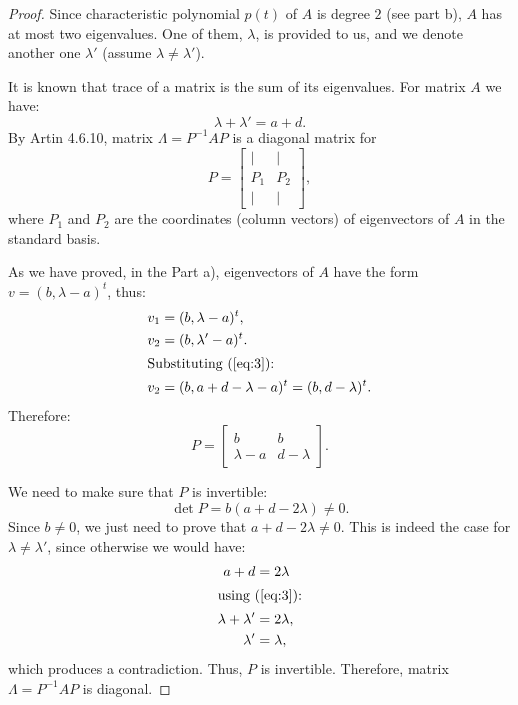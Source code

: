 \documentclass{article}
\theoremstyle{definition}
\begin{document}
\begin{proof}

Since characteristic polynomial $p(t)$ of $A$ is degree $2$ (see part b), $A$ has at most two eigenvalues. One of them, $\lambda$, is provided to us, and we denote another one $\lambda'$ (assume $\lambda \neq \lambda'$).

It is known that trace of a matrix is the sum of its eigenvalues. For matrix $A$ we have:
\begin{equation} \label{eq:3}
    \lambda + \lambda' = a+d.
\end{equation}
By Artin 4.6.10, matrix $\Lambda = P^{-1} A P$ is a diagonal matrix for
\[
    P = 
    \begin{bmatrix}
        | & | \\
        P_1 & P_2 \\
        | & |
    \end{bmatrix},
\]
where $P_1$ and $P_2$ are the coordinates (column vectors) of eigenvectors of $A$ in the standard basis.

As we have proved, in the Part a), eigenvectors of $A$ have the form $v = (b, \lambda - a)^t$, thus:
\begin{align*}
    v_1
    & = (b, \lambda - a)^t, \\
    v_2 
    & = (b, \lambda' - a)^t. \\
    \intertext{Substituting (\ref{eq:3}):}
    v_2
    & = (b, a+d-\lambda - a)^t = (b, d - \lambda)^t.
\end{align*}
Therefore:
\[
    P = 
    \begin{bmatrix}
        b & b \\
        \lambda - a & d - \lambda
    \end{bmatrix}.
\]

We need to make sure that $P$ is invertible:
\[ \det P = b (a + d - 2 \lambda) \neq 0. \]
Since $b \neq 0$, we just need to prove that $a+d-2\lambda \neq 0$. This is indeed the case for $\lambda \neq \lambda'$, since otherwise we would have:
\begin{align*}
    a+d & = 2\lambda \\
    \shortintertext{using (\ref{eq:3}):}
    \lambda + \lambda' & = 2\lambda, \\
    \lambda' & = \lambda,
\end{align*}
which produces a contradiction.
Thus, $P$ is invertible.
Therefore, matrix $\Lambda = P^{-1} A P$ is diagonal.

\end{proof}
\end{document}
